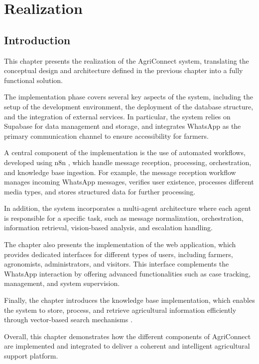 \chapter{Realization}

\section{Introduction}

This chapter presents the realization of the AgriConnect system, translating the conceptual design and architecture defined in the previous chapter into a fully functional solution.

The implementation phase covers several key aspects of the system, including the setup of the development environment, the deployment of the database structure, and the integration of external services. In particular, the system relies on Supabase for data management and storage, and integrates WhatsApp as the primary communication channel to ensure accessibility for farmers.

A central component of the implementation is the use of automated workflows, developed using n8n \cite{n8n2024}, which handle message reception, processing, orchestration, and knowledge base ingestion. For example, the message reception workflow manages incoming WhatsApp messages, verifies user existence, processes different media types, and stores structured data for further processing.

In addition, the system incorporates a multi-agent architecture where each agent is responsible for a specific task, such as message normalization, orchestration, information retrieval, vision-based analysis, and escalation handling.

The chapter also presents the implementation of the web application, which provides dedicated interfaces for different types of users, including farmers, agronomists, administrators, and visitors. This interface complements the WhatsApp interaction by offering advanced functionalities such as case tracking, management, and system supervision.

Finally, the chapter introduces the knowledge base implementation, which enables the system to store, process, and retrieve agricultural information efficiently through vector-based search mechanisms \cite{li2025llm}.

Overall, this chapter demonstrates how the different components of AgriConnect are implemented and integrated to deliver a coherent and intelligent agricultural support platform.


